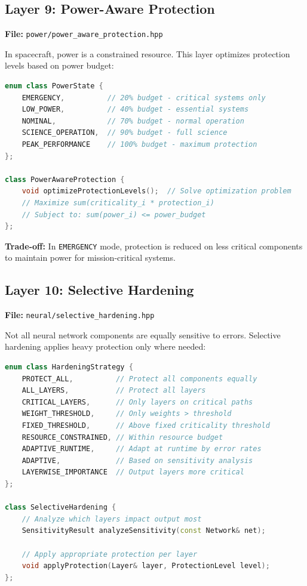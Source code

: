 \documentclass[11pt,a4paper]{article}
\begin{document}
\subsection{Layer 9: Power-Aware Protection}

\textbf{File:} \texttt{power/power\_aware\_protection.hpp}

In spacecraft, power is a constrained resource. This layer optimizes protection levels based on power budget:

\begin{lstlisting}[language=C++, basicstyle=\footnotesize\ttfamily]
enum class PowerState {
    EMERGENCY,          // 20% budget - critical systems only
    LOW_POWER,          // 40% budget - essential systems
    NOMINAL,            // 70% budget - normal operation
    SCIENCE_OPERATION,  // 90% budget - full science
    PEAK_PERFORMANCE    // 100% budget - maximum protection
};

class PowerAwareProtection {
    void optimizeProtectionLevels();  // Solve optimization problem
    // Maximize sum(criticality_i * protection_i)
    // Subject to: sum(power_i) <= power_budget
};
\end{lstlisting}

\textbf{Trade-off:} In \texttt{EMERGENCY} mode, protection is reduced on less critical components to maintain power for mission-critical systems.

\subsection{Layer 10: Selective Hardening}

\textbf{File:} \texttt{neural/selective\_hardening.hpp}

Not all neural network components are equally sensitive to errors. Selective hardening applies heavy protection only where needed:

\begin{lstlisting}[language=C++, basicstyle=\footnotesize\ttfamily]
enum class HardeningStrategy {
    PROTECT_ALL,          // Protect all components equally
    ALL_LAYERS,           // Protect all layers
    CRITICAL_LAYERS,      // Only layers on critical paths
    WEIGHT_THRESHOLD,     // Only weights > threshold
    FIXED_THRESHOLD,      // Above fixed criticality threshold
    RESOURCE_CONSTRAINED, // Within resource budget
    ADAPTIVE_RUNTIME,     // Adapt at runtime by error rates
    ADAPTIVE,             // Based on sensitivity analysis
    LAYERWISE_IMPORTANCE  // Output layers more critical
};

class SelectiveHardening {
    // Analyze which layers impact output most
    SensitivityResult analyzeSensitivity(const Network& net);

    // Apply appropriate protection per layer
    void applyProtection(Layer& layer, ProtectionLevel level);
};
\end{lstlisting}
\end{document}
